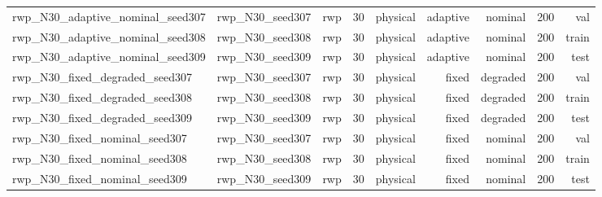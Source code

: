 \begin{tabular}{lrrrrrrrr}
rwp\_N30\_adaptive\_nominal\_seed307 & rwp\_N30\_seed307 & rwp & 30 & physical & adaptive & nominal & 200 & val \\
rwp\_N30\_adaptive\_nominal\_seed308 & rwp\_N30\_seed308 & rwp & 30 & physical & adaptive & nominal & 200 & train \\
rwp\_N30\_adaptive\_nominal\_seed309 & rwp\_N30\_seed309 & rwp & 30 & physical & adaptive & nominal & 200 & test \\
rwp\_N30\_fixed\_degraded\_seed307 & rwp\_N30\_seed307 & rwp & 30 & physical & fixed & degraded & 200 & val \\
rwp\_N30\_fixed\_degraded\_seed308 & rwp\_N30\_seed308 & rwp & 30 & physical & fixed & degraded & 200 & train \\
rwp\_N30\_fixed\_degraded\_seed309 & rwp\_N30\_seed309 & rwp & 30 & physical & fixed & degraded & 200 & test \\
rwp\_N30\_fixed\_nominal\_seed307 & rwp\_N30\_seed307 & rwp & 30 & physical & fixed & nominal & 200 & val \\
rwp\_N30\_fixed\_nominal\_seed308 & rwp\_N30\_seed308 & rwp & 30 & physical & fixed & nominal & 200 & train \\
rwp\_N30\_fixed\_nominal\_seed309 & rwp\_N30\_seed309 & rwp & 30 & physical & fixed & nominal & 200 & test \\
\bottomrule
\end{tabular}